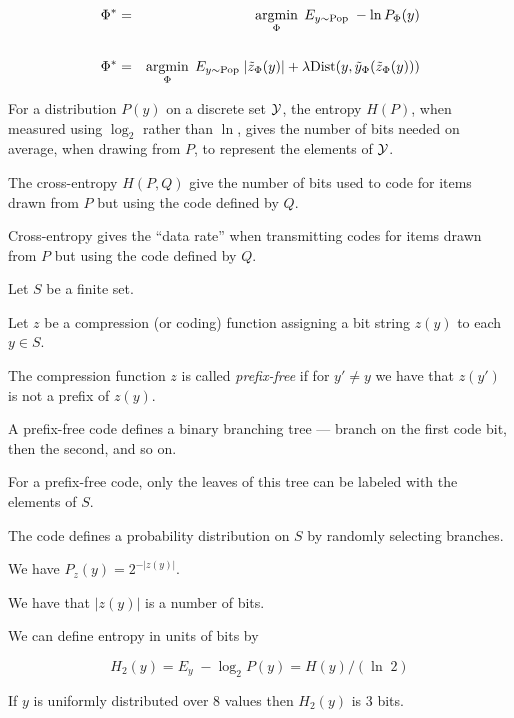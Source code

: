 {\vfill
{\color{red}
\begin{eqnarray*}
\Phi^* & = & \operatorname*{argmin}_\Phi \;E_{y \sim \mathrm{Pop}} \;-\ln P_\Phi(y) \\
\\
\Phi^* & = & \operatorname*{argmin}_\Phi \;E_{y \sim \mathrm{Pop}} \;|\tilde{z}_\Phi(y)| + \lambda \mathrm{Dist}(y,\tilde{y}_\Phi(\tilde{z}_\Phi(y)))
\end{eqnarray*}
}




For a distribution $P(y)$ on a discrete set ${\cal Y}$, the entropy $H(P)$, when measured using $\log_2$ rather than $\ln$, gives the number of bits needed
on average, when drawing from $P$, to represent the elements of ${\cal Y}$.

\vfill
The cross-entropy $H(P,Q)$ give the number of bits used to code for items drawn from $P$ but using the code defined by $Q$.

\vfill
Cross-entropy gives the ``data rate'' when transmitting codes for items drawn from $P$ but using the code defined by $Q$.


Let $S$ be a finite set.

\vfill
Let $z$ be a compression (or coding) function  assigning a bit string $z(y)$ to each $y \in S$.

\vfill
The compression function $z$ is called {\em prefix-free} if for $y' \not = y$ we have that $z(y')$ is not a prefix of $z(y)$.


A prefix-free code defines a binary branching tree --- branch on the first code bit, then the second, and so on.

\vfill
For a prefix-free code, only the leaves of this tree can be labeled with the elements of $S$.

\vfill
The code defines a probability distribution on $S$ by randomly selecting branches.

\vfill
We have $P_z(y) = 2^{-|z(y)|}$.


We have that $|z(y)|$ is a number of bits.

\vfill
We can define entropy in units of bits by

\vfill
$$H_2(y) = E_y\; - \log_2 P(y) = H(y)/(\ln \;2)$$

\vfill
If $y$ is uniformly distributed over 8 values then $H_2(y)$ is 3 bits.

}
